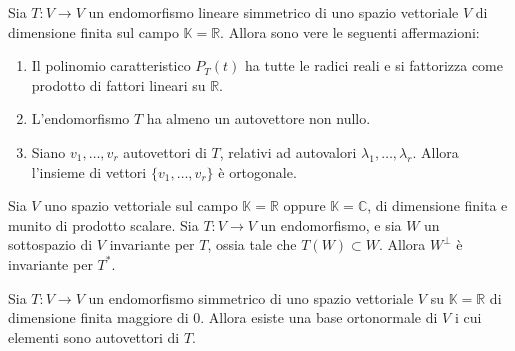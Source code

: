 \begin{theorem}
	Sia $T : V \to V$ un endomorfismo lineare simmetrico di uno spazio vettoriale
	$V$ di dimensione finita sul campo $\mathbb{K} = \mathbb{R}$. Allora sono vere
	le seguenti affermazioni:
	\begin{enumerate}
		\item Il polinomio caratteristico $P_T(t)$ ha tutte le radici reali e si
		      fattorizza come prodotto di fattori lineari su $\mathbb{R}$.
		\item L'endomorfismo $T$ ha almeno un autovettore non nullo.
		\item Siano $v_1, \dots, v_r$ autovettori di $T$, relativi ad autovalori
		      $\lambda_1, \dots, \lambda_r$. Allora l'insieme di vettori
		      $\{v_1, \dots, v_r\}$ \`e ortogonale.
	\end{enumerate}
\end{theorem}

\begin{lemma}
	Sia $V$ uno spazio vettoriale sul campo $\mathbb{K} = \mathbb{R}$ oppure
	$\mathbb{K} = \mathbb{C}$, di dimensione finita e munito di prodotto scalare.
	Sia $T : V \to V$ un endomorfismo, e sia $W$ un sottospazio di $V$ invariante
	per $T$, ossia tale che $T(W) \subset W$. Allora $W^\perp$ \`e invariante per
	$T^*$.
\end{lemma}

\begin{theorem}
	Sia $T : V  \to V$ un endomorfismo simmetrico di uno spazio vettoriale $V$ su
	$\mathbb{K} = \mathbb{R}$ di dimensione finita maggiore di 0. Allora esiste una
	base ortonormale di $V$ i cui elementi sono autovettori di $T$.
\end{theorem}


